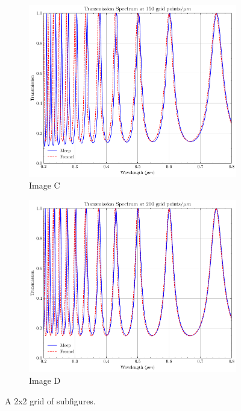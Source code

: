\begin{figure}[H]
  \vspace{0.5cm}
  
  \begin{subfigure}[b]{0.45\textwidth}
      \centering
      \includegraphics[width=\textwidth]{obrazky-figures/Transmission_eps25.0_h0.3_r150.pdf}
      \caption{Image C}
      \label{fig:subfig3}
  \end{subfigure}
  \hfill
  \begin{subfigure}[b]{0.45\textwidth}
      \centering
      \includegraphics[width=\textwidth]{obrazky-figures/Transmission_eps25.0_h0.3_r200.pdf}
      \caption{Image D}
      \label{fig:subfig4}
  \end{subfigure}
  
  \caption{A 2x2 grid of subfigures.}
  \label{fig:2x2grid}
\end{figure}


